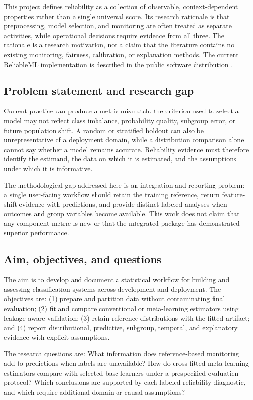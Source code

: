 \documentclass[conference]{IEEEtran}
\begin{document}
This project defines reliability as a collection of observable, context-dependent properties rather than a single universal score. Its research rationale is that preprocessing, model selection, and monitoring are often treated as separate activities, while operational decisions require evidence from all three. The rationale is a research motivation, not a claim that the literature contains no existing monitoring, fairness, calibration, or explanation methods. The current ReliableML implementation is described in the public software distribution \cite{software}.

\subsection{Problem statement and research gap}
Current practice can produce a metric mismatch: the criterion used to select a model may not reflect class imbalance, probability quality, subgroup error, or future population shift. A random or stratified holdout can also be unrepresentative of a deployment domain, while a distribution comparison alone cannot say whether a model remains accurate. Reliability evidence must therefore identify the estimand, the data on which it is estimated, and the assumptions under which it is informative.

The methodological gap addressed here is an integration and reporting problem: a single user-facing workflow should retain the training reference, return feature-shift evidence with predictions, and provide distinct labeled analyses when outcomes and group variables become available. This work does not claim that any component metric is new or that the integrated package has demonstrated superior performance.

\subsection{Aim, objectives, and questions}
The aim is to develop and document a statistical workflow for building and assessing classification systems across development and deployment. The objectives are: (1) prepare and partition data without contaminating final evaluation; (2) fit and compare conventional or meta-learning estimators using leakage-aware validation; (3) retain reference distributions with the fitted artifact; and (4) report distributional, predictive, subgroup, temporal, and explanatory evidence with explicit assumptions.

The research questions are: What information does reference-based monitoring add to predictions when labels are unavailable? How do cross-fitted meta-learning estimators compare with selected base learners under a prespecified evaluation protocol? Which conclusions are supported by each labeled reliability diagnostic, and which require additional domain or causal assumptions?
\end{document}
